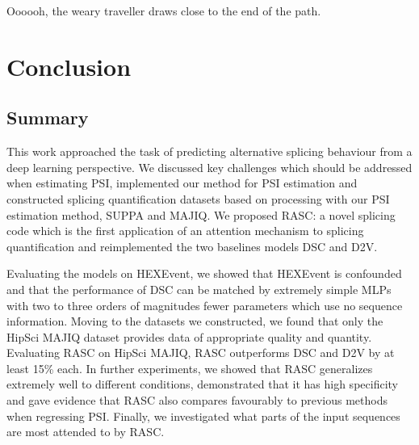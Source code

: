 \begin{savequote}[8cm]
	
	Oooooh, the weary traveller draws close to the end of the path.
\end{savequote}

\chapter{\label{ch:6-conclusion}Conclusion} %
\section{Summary}
This work approached the task of predicting alternative splicing behaviour from a deep learning perspective.
We discussed key challenges which should be addressed when estimating PSI, implemented our method for PSI estimation and constructed splicing quantification datasets based on processing with our PSI estimation method, SUPPA and MAJIQ. We proposed RASC: a novel splicing code which is the first application of an attention mechanism to splicing quantification and reimplemented the two baselines models DSC and D2V. %

Evaluating the models on HEXEvent, we showed that HEXEvent is confounded and that the performance of DSC can be matched by extremely simple MLPs with two to three orders of magnitudes fewer parameters which use no sequence information. 
Moving to the datasets we constructed, we found that only the HipSci MAJIQ dataset provides data of appropriate quality and quantity. Evaluating RASC on HipSci MAJIQ, RASC outperforms DSC and D2V by at least 15\% each. In further experiments, we showed that RASC generalizes extremely well to different conditions, demonstrated that it has high specificity and gave evidence that RASC also compares favourably to previous methods when regressing PSI. Finally, we investigated what parts of the input sequences are most attended to by RASC.
